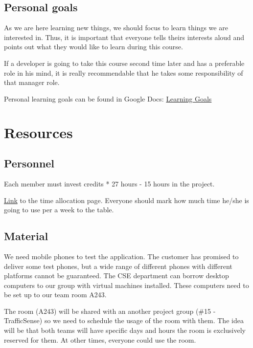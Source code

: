 \subsection{Personal goals}

As we are here learning new things, we should focus to learn things we are interested in. Thus, it is important that everyone tells theirs interests aloud and points out what they would like to learn during this course. 

If a developer is going to take this course second time later and has a preferable role in his mind, it is really recommendable that he takes some responsibility of that manager role.

Personal learning goals can be found in Google Docs: 
\href{https://docs.google.com/spreadsheet/ccc?key=0Ahu59q_GwtcedHJZdjQ1RWROZFYxa
0RTcWp3MkJkTnc&usp=sharing}{Learning Goals}

\section{Resources}
\subsection{Personnel}

Each member must invest credits * 27 hours - 15 hours in the project.

\href{https://docs.google.com/spreadsheet/ccc?key=0Ahu59q_GwtcedHI3MnJQM0NWZS11a
GxFTzFZeVEyQVE&usp=sharing}{Link} to the time allocation page. Everyone should 
mark how much time he/she is going to use per a week to the table.

\subsection{Material}

We need mobile phones to test the application. The customer has promised to 
deliver some test phones, but a wide range of different phones with different 
platforms cannot be guaranteed. The CSE department can borrow desktop computers 
to our group with virtual machines installed. These computers need to be set up 
to our team room A243.

The room (A243) will be shared with an another project group (\#15 - 
TrafficSense) so we need to schedule the usage of the room with them. The idea 
will be that both teams will have specific days and hours the room is 
exclusively reserved for them. At other times, everyone could use the room.

